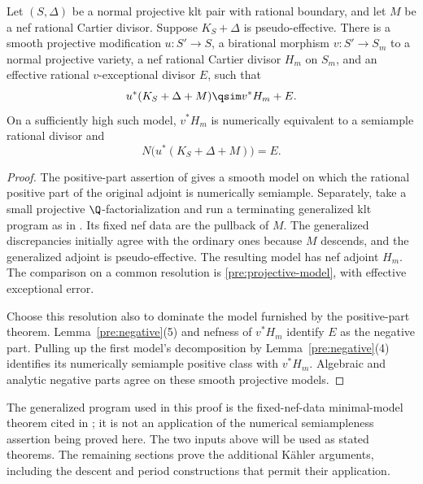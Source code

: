 \begin{proposition}\label{pre:projective}
Let \((S,\Delta)\) be a normal projective klt pair with rational boundary,
and let \(M\) be a nef rational Cartier divisor. Suppose
\(K_S+\Delta\) is pseudo-effective.
There is a smooth projective modification \(u:S'\to S\), a birational
morphism \(v:S'\to S_m\) to a normal projective variety, a nef rational
Cartier divisor \(H_m\) on \(S_m\), and an effective rational
\(v\)-exceptional divisor \(E\), such that
\begin{equation}\label{pre:projective-model}
 u^*(K_S+\Delta+M)\qsim v^*H_m+E.
\end{equation}
On a sufficiently high such model, \(v^*H_m\) is numerically equivalent
to a semiample rational divisor and
\[
 N\bigl(u^*(K_S+\Delta+M)\bigr)=E.
\]
\end{proposition}
\begin{proof}
The positive-part assertion of \cite[Proposition~8.1]{P} gives a smooth
model on which the rational positive part of the original adjoint
is numerically semiample. Separately, take a small projective
\(\Q\)-factorialization and run a terminating generalized klt program
as in \cite[Theorem~2.3]{P}. Its fixed nef data are the pullback of \(M\).
The generalized discrepancies initially agree with the ordinary ones
because \(M\) descends, and the generalized adjoint is pseudo-effective.
The resulting model has nef adjoint \(H_m\). The comparison on a common
resolution is \eqref{pre:projective-model}, with effective exceptional
error.

Choose this resolution also to dominate the model furnished by
the positive-part theorem. Lemma~\ref{pre:negative}(5) and nefness of
\(v^*H_m\) identify \(E\) as the negative part. Pulling up the first
model's decomposition by Lemma~\ref{pre:negative}(4) identifies its
numerically semiample positive class with \(v^*H_m\). Algebraic and
analytic negative parts agree on these smooth projective models.
\end{proof}

The generalized program used in this proof is the fixed-nef-data
minimal-model theorem cited in \cite{P}; it is not an application of
the numerical semiampleness assertion being proved here. The two inputs
above will be used as stated theorems. The remaining sections prove the
additional K\"ahler arguments, including the descent and period
constructions that permit their application.
